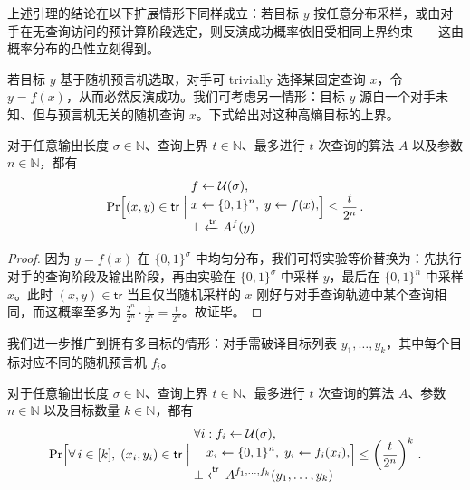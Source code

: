 \documentclass[american,singlepageview]{snargs-book-zh}
\renewcommand{\enspace}{\ensuremath{\thinspace}}
\newcommand{\Bits}{\{0,1\}}
\newcommand{\Naturals}{\mathbb{N}}
\newcommand{\ProtoAdversary}{A}
\newcommand{\ROFunction}{f}
\newcommand{\ROQueryBound}{t}
\newcommand{\RODistribution}[1]{\mathcal{U}(#1)}
\newcommand{\ROInputOutputAndTrace}[5]{#5 \xleftarrow{#4} {#2}^{#1}(#3)}
\newcommand{\ROSaltSize}{n}
\newcommand{\ROVectorLength}{k}
\newcommand{\ROQuery}{x}
\newcommand{\ROAnswer}{y}
\newcommand{\ROTrace}{\mathsf{tr}}
\newcommand{\ROAdversary}{\ProtoAdversary}
\newcommand{\ROOutputSize}{\sigma}
\newcommand{\ROOWEntropyExpression}[1]{\frac{\ROQueryBound}{2^{#1}}}
\newcommand{\ROOWEntropyExpressionVector}[2]{\left(\frac{\ROQueryBound}{2^{#1}}\right)^{#2}}
\begin{document}
上述引理的结论在以下扩展情形下同样成立：若目标 $\ROAnswer$ 按任意分布采样，或由对手在无查询访问的预计算阶段选定，则反演成功概率依旧受相同上界约束——这由概率分布的凸性立刻得到。

若目标 $\ROAnswer$ 基于随机预言机选取，对手可 trivially 选择某固定查询 $\ROQuery$，令 $\ROAnswer=\ROFunction(\ROQuery)$，从而必然反演成功。我们可考虑另一情形：目标 $\ROAnswer$ 源自一个对手未知、但与预言机无关的随机查询 $\ROQuery$。下式给出对这种高熵目标的上界。

\begin{lemma}
\label{lemma:rom-ow-high-entropy}
对于任意输出长度 $\ROOutputSize\in\Naturals$、查询上界 $\ROQueryBound\in\Naturals$、最多进行 $\ROQueryBound$ 次查询的算法 $\ROAdversary$ 以及参数 $\ROSaltSize\in\Naturals$，都有
\[
\Pr\Bigl[
(\ROQuery,\ROAnswer)\in\ROTrace
\;\Big|\;
\begin{aligned}
&\ROFunction\gets\RODistribution{\ROOutputSize},\\
&\ROQuery\gets\Bits^{\ROSaltSize},\;
\ROAnswer\gets\ROFunction(\ROQuery),\\
&\ROInputOutputAndTrace{\ROFunction}{\ROAdversary}{\ROAnswer}{\ROTrace}{\bot}
\end{aligned}
\Bigr]
\le
\ROOWEntropyExpression{\ROSaltSize}
\enspace.
\]
\end{lemma}

\begin{proof}
因为 $\ROAnswer=\ROFunction(\ROQuery)$ 在 $\Bits^{\ROOutputSize}$ 中均匀分布，我们可将实验等价替换为：先执行对手的查询阶段及输出阶段，再由实验在 $\Bits^{\ROOutputSize}$ 中采样 $\ROAnswer$，最后在 $\Bits^{\ROSaltSize}$ 中采样 $\ROQuery$。此时 $(\ROQuery,\ROAnswer)\in\ROTrace$ 当且仅当随机采样的 $\ROQuery$ 刚好与对手查询轨迹中某个查询相同，而这概率至多为 $\tfrac{2^{\ROSaltSize}}{2^{\ROSaltSize}}\cdot\frac{1}{2^{\ROSaltSize}}=\ROOWEntropyExpression{\ROSaltSize}$。故证毕。
\end{proof}

我们进一步推广到拥有多目标的情形：对手需破译目标列表 $\ROAnswer_{1},\dots,\ROAnswer_{\ROVectorLength}$，其中每个目标对应不同的随机预言机 $\ROFunction_{i}$。

\begin{lemma}
\label{lemma:rom-ow-high-entropy-vector}
对于任意输出长度 $\ROOutputSize\in\Naturals$、查询上界 $\ROQueryBound\in\Naturals$、最多进行 $\ROQueryBound$ 次查询的算法 $\ROAdversary$、参数 $\ROSaltSize\in\Naturals$ 以及目标数量 $\ROVectorLength\in\Naturals$，都有
\[
\Pr\Bigl[
\forall\,i\in[\ROVectorLength],\;(\ROQuery_{i},\ROAnswer_{i})\in\ROTrace
\;\Big|\;
\begin{aligned}
&\forall i:\ROFunction_{i}\gets\RODistribution{\ROOutputSize},\\
&\quad\ROQuery_{i}\gets\Bits^{\ROSaltSize},\;\ROAnswer_{i}\gets\ROFunction_{i}(\ROQuery_{i}),\\
&\ROInputOutputAndTrace{\ROFunction_{1},\dots,\ROFunction_{\ROVectorLength}}{\ROAdversary}{\ROAnswer_{1},\dots,\ROAnswer_{\ROVectorLength}}{\ROTrace}{\bot}
\end{aligned}
\Bigr]
\le
\ROOWEntropyExpressionVector{\ROSaltSize}{\ROVectorLength}
\enspace.
\]
\end{lemma}
\end{document}
